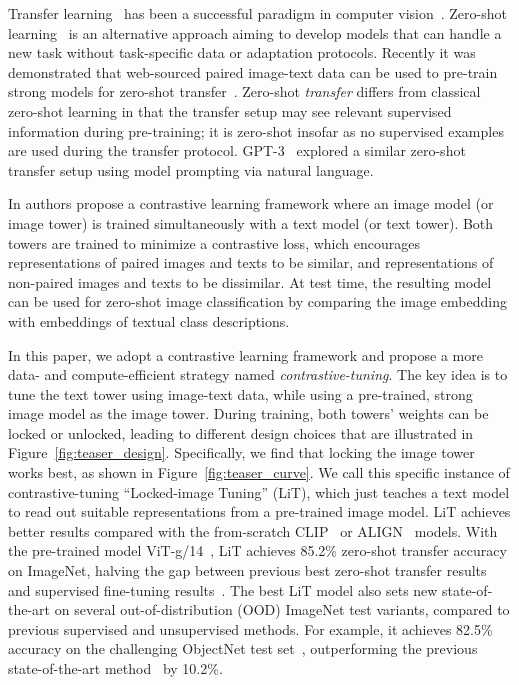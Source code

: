 \documentclass[10pt,twocolumn,letterpaper]{article}
\def \lit {LiT\xspace}
\def\objsota{82.5}
\begin{document}
Transfer learning~\cite{transfer_learning_survey} has been a successful paradigm in computer vision~\cite{imagenet_transfer_better,bit,instagram_resnext}.
Zero-shot learning~\cite{zero_data_learning,visual_attribute,zsl_good_bad_ugly} is an alternative approach aiming to develop models that can handle a new task without task-specific data or adaptation protocols.
Recently it was demonstrated that web-sourced paired image-text data can be used to pre-train strong models for zero-shot transfer~\cite{clip,align}. 
Zero-shot \textit{transfer} differs from classical zero-shot learning in that the transfer setup may see relevant supervised information during pre-training; it is zero-shot insofar as no supervised examples are used during the transfer protocol.
\mbox{GPT-3}~\cite{gpt3} explored a similar zero-shot transfer setup using model prompting via natural language. 

In \cite{clip,align} authors propose a contrastive learning frame\-work where an image model (or image tower) is trained simultaneously with a text model (or text tower). 
Both towers are trained to minimize a contrastive loss, which encourages representations of paired images and texts to be similar, and representations of non-paired images and texts to be dissimilar. 
At test time, the resulting model can be used for zero-shot image classification by comparing the image embedding with embeddings of textual class descriptions.

In this paper, we adopt a contrastive learning framework and propose a more data- and compute-efficient strategy named \textit{contrastive-tuning}. 
The key idea is to tune the text tower using image-text data, while using a pre-trained, strong image model as the image tower. 
During training, both towers' weights can be locked or unlocked, leading to different design choices that are illustrated in Figure~\ref{fig:teaser_design}.
Specifically, we find that locking the image tower works best, as shown in Figure~\ref{fig:teaser_curve}. 
We call this specific instance of contrastive-tuning “Locked-image Tuning” (\lit{}),
which just teaches a text model to read out suitable representations from a pre-trained image model. \lit{} achieves better results compared with the from-scratch CLIP~\cite{clip} or ALIGN~\cite{align} models.
With the pre-trained model ViT-g/14~\cite{vitg}, \lit{} achieves 85.2\% zero-shot transfer accuracy on ImageNet, halving the gap between previous best zero-shot transfer results~\cite{clip,align} and supervised fine-tuning results~\cite{vitg,coatnet}. The best \lit{} model also sets new state-of-the-art on several out-of-distribution (OOD) ImageNet test variants, compared to previous supervised and unsupervised methods.
For example, it achieves \objsota{}\% accuracy on the challenging ObjectNet test set~\cite{objectnet}, outperforming the previous state-of-the-art method~\cite{clip} by 10.2\%. 
\end{document}
